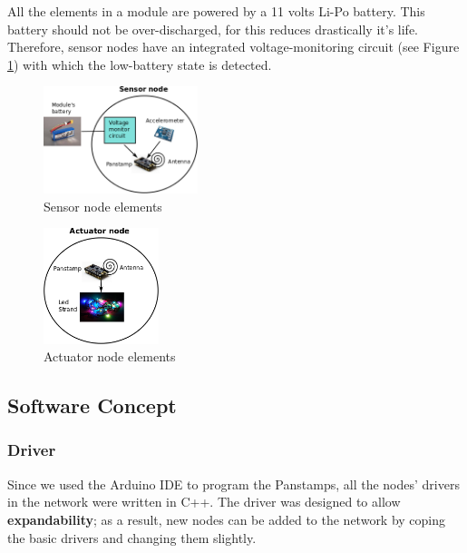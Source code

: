 All the elements in a module are powered by a 11 volts Li-Po battery. This battery should not be over-discharged, for this reduces drastically it's life. Therefore, sensor nodes have an integrated voltage-monitoring circuit (see Figure \ref{fig:sensor-node}) with which the low-battery state is detected.

\begin{figure}[h!]
 \centering
 \includegraphics[width= 0.4\textwidth, clip=true  ,keepaspectratio=true]{./graph/sensor_node.png}
 \caption{Sensor node elements}
 \label{fig:sensor-node}
\end{figure}


\begin{figure}[h!]
 \centering
 \includegraphics[width= 0.3\textwidth, clip=true  ,keepaspectratio=true]{./graph/actuator_node.png}
 \caption{Actuator node elements}
 \label{fig:actuator-node}
\end{figure}



\subsection{Software Concept} 

\subsubsection{Driver} 
Since we used the Arduino IDE to program the Panstamps, all the nodes' drivers in the network were written in C++. The driver was designed to allow \textbf{expandability}; as a result, new nodes can be added to the network by coping the basic drivers and changing them slightly. 

